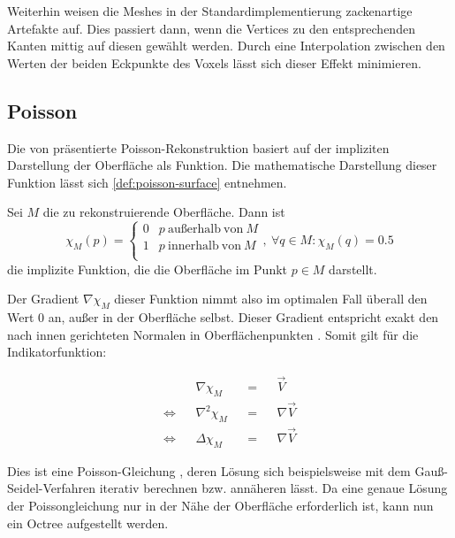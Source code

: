 Weiterhin weisen die Meshes in der Standardimplementierung zackenartige Artefakte auf.
Dies passiert dann, wenn die Vertices zu den entsprechenden Kanten mittig auf diesen gewählt werden.
Durch eine Interpolation zwischen den Werten der beiden Eckpunkte des Voxels lässt sich dieser Effekt minimieren.


\subsection{Poisson}
\label{subsec:poisson}

Die \citeyear{kazhdan2006poisson} von \citeauthor{kazhdan2006poisson} präsentierte Poisson-Rekonstruktion \cite{kazhdan2006poisson} basiert auf der impliziten Darstellung der Oberfläche als Funktion.
Die mathematische Darstellung dieser Funktion lässt sich \autoref{def:poisson-surface} entnehmen.

\begin{definition}
\label{def:poisson-surface}
Sei $M$ die zu rekonstruierende Oberfläche.
Dann ist
\begin{equation}
\chi_M(p) = \left\{
\begin{array}{ll}
0 & p\ \mathrm{außerhalb\ von}\ M\\
1 & p\ \mathrm{innerhalb\ von}\ M\\
\end{array}
\right.
,\ \forall q \in M : \chi_M(q) = 0.5
\end{equation}
die implizite Funktion, die die Oberfläche im Punkt $p \in M$ darstellt.
\end{definition}

Der Gradient $\nabla \chi_M$ dieser Funktion nimmt also im optimalen Fall überall den Wert $0$ an, außer in der Oberfläche selbst.
Dieser Gradient entspricht exakt den nach innen gerichteten Normalen in Oberflächenpunkten \cite[Abs. 3]{kazhdan2006poisson}.
Somit gilt für die Indikatorfunktion:

\begin{displaymath}
\begin{aligned}
&&\nabla \chi_M && = &&\overrightarrow{V}\\
\Leftrightarrow && \nabla^2 \chi_M && = &&\nabla \overrightarrow{V}\\
\Leftrightarrow && \Delta \chi_M && = &&\nabla \overrightarrow{V}
\end{aligned}
\end{displaymath}

Dies ist eine Poisson-Gleichung \cite[Kap. 2]{ponce2016pde}, deren Lösung sich beispielsweise mit dem Gauß-Seidel-Verfahren iterativ berechnen bzw. annäheren lässt.
Da eine genaue Lösung der Poissongleichung nur in der Nähe der Oberfläche erforderlich ist, kann nun ein Octree aufgestellt werden.

